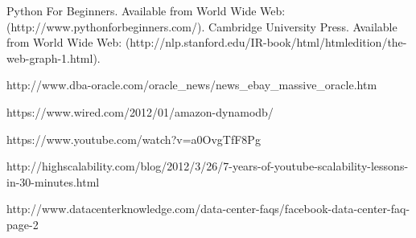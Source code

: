 \documentclass[a4paper, 11pt]{article}
\begin{document}
\begin{thebibliography}{9}
 Python For Beginners. Available from World Wide Web:(http://www.pythonforbeginners.com/).
 Cambridge University Press. Available from World Wide Web: (http://nlp.stanford.edu/IR-book/html/htmledition/the-web-graph-1.html).

http://www.dba-oracle.com/oracle_news/news_ebay_massive_oracle.htm

https://www.wired.com/2012/01/amazon-dynamodb/

https://www.youtube.com/watch?v=a0OvgTfF8Pg

http://highscalability.com/blog/2012/3/26/7-years-of-youtube-scalability-lessons-in-30-minutes.html

http://www.datacenterknowledge.com/data-center-faqs/facebook-data-center-faq-page-2

\end{thebibliography}
\end{document}
